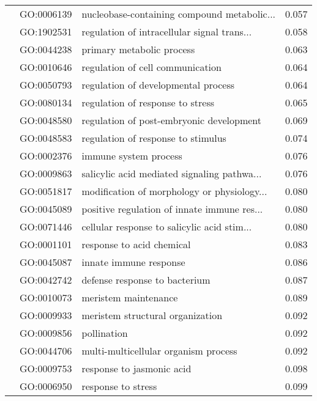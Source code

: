 \begin{longtable}{lllr}
   & GO:0006139 &  nucleobase-containing compound metabolic... &         0.057 \\
   & GO:1902531 &  regulation of intracellular signal trans... &         0.058 \\
   & GO:0044238 &                    primary metabolic process &         0.063 \\
   & GO:0010646 &             regulation of cell communication &         0.064 \\
   & GO:0050793 &          regulation of developmental process &         0.064 \\
   & GO:0080134 &             regulation of response to stress &         0.065 \\
   & GO:0048580 &     regulation of post-embryonic development &         0.069 \\
   & GO:0048583 &           regulation of response to stimulus &         0.074 \\
   & GO:0002376 &                        immune system process &         0.076 \\
   & GO:0009863 &  salicylic acid mediated signaling pathwa... &         0.076 \\
   & GO:0051817 &  modification of morphology or physiology... &         0.080 \\
   & GO:0045089 &  positive regulation of innate immune res... &         0.080 \\
   & GO:0071446 &  cellular response to salicylic acid stim... &         0.080 \\
   & GO:0001101 &                    response to acid chemical &         0.083 \\
   & GO:0045087 &                       innate immune response &         0.086 \\
   & GO:0042742 &                defense response to bacterium &         0.087 \\
   & GO:0010073 &                         meristem maintenance &         0.089 \\
   & GO:0009933 &             meristem structural organization &         0.092 \\
   & GO:0009856 &                                  pollination &         0.092 \\
   & GO:0044706 &         multi-multicellular organism process &         0.092 \\
   & GO:0009753 &                    response to jasmonic acid &         0.098 \\
   & GO:0006950 &                           response to stress &         0.099 \\

\end{longtable}
